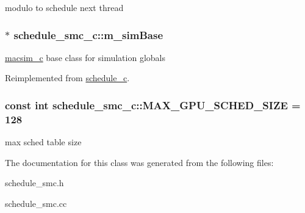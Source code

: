 \label{classschedule__smc__c_aeb0d028cbba234e9e93abede46bba2ca}
modulo to schedule next thread \hypertarget{classschedule__smc__c_a40d5c66331f8f72123691ebbb4590f3b}{
\subsubsection[{m\_\-simBase}]{$\ast$ {\bf schedule\_\-smc\_\-c::m\_\-simBase}}}
\label{classschedule__smc__c_a40d5c66331f8f72123691ebbb4590f3b}
\hyperlink{classmacsim__c}{macsim\_\-c} base class for simulation globals 

Reimplemented from \hyperlink{classschedule__c_a0db71234050b2c33f454b5d65d458564}{schedule\_\-c}.

\hypertarget{classschedule__smc__c_a70bea811c0a494c3741fa64b319b0001}{
\subsubsection[{MAX\_\-GPU\_\-SCHED\_\-SIZE}]{\setlength{\rightskip}{0pt plus 5cm}const int {\bf schedule\_\-smc\_\-c::MAX\_\-GPU\_\-SCHED\_\-SIZE} = 128}}
\label{classschedule__smc__c_a70bea811c0a494c3741fa64b319b0001}
max sched table size 

The documentation for this class was generated from the following files:\begin{DoxyCompactItemize}
\item 
schedule\_\-smc.h\item 
schedule\_\-smc.cc\end{DoxyCompactItemize}
